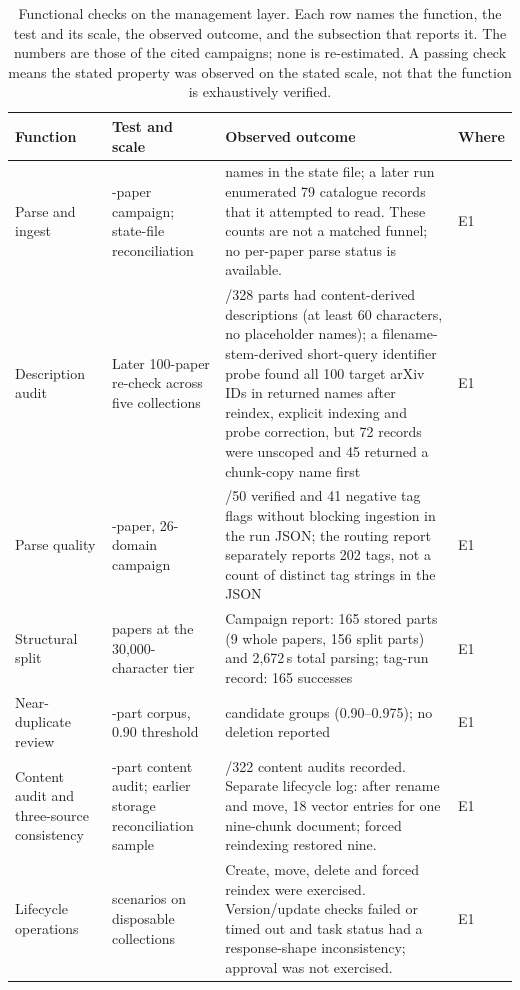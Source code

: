 \documentclass[final,5p,times,twocolumn]{elsarticle}
\begin{document}
\begin{table}[t]
\centering
\footnotesize
\setlength{\tabcolsep}{4pt}
\caption{Functional checks on the management layer. Each row names the
function, the test and its scale, the observed outcome, and the subsection
that reports it. The numbers are those of the cited campaigns; none is
re-estimated. A passing check means the stated property was observed on the
stated scale, not that the function is exhaustively verified.}
\label{tab:kb-checks}
\begin{tabular}{@{}>{\raggedright\arraybackslash}p{}>{\raggedright\arraybackslash}p{}>{\raggedright\arraybackslash}p{}>{\raggedright\arraybackslash}p{}@{}}
\toprule
Function & Test and scale & Observed outcome & Where\\
\midrule
Parse and ingest & 100-paper campaign; state-file reconciliation & 91 names in the state file; a later run enumerated 79 catalogue records that it attempted to read. These counts are not a matched funnel; no per-paper parse status is available. & E1\\
Description audit & Later 100-paper re-check across five collections & 328/328 parts had content-derived descriptions (at least 60 characters, no placeholder names); a filename-stem-derived short-query identifier probe found all 100 target arXiv IDs in returned names after reindex, explicit indexing and probe correction, but 72 records were unscoped and 45 returned a chunk-copy name first & E1\\
Parse quality & 50-paper, 26-domain campaign & 50/50 verified and 41 negative tag flags without blocking ingestion in the run JSON; the routing report separately reports 202 tags, not a count of distinct tag strings in the JSON & E1\\
Structural split & 50 papers at the 30{,}000-character tier & Campaign report: 165 stored parts (9 whole papers, 156 split parts) and 2{,}672\,s total parsing; tag-run record: 165 successes & E1\\
Near-duplicate review & 322-part corpus, 0.90 threshold & 35 candidate groups (0.90--0.975); no deletion reported & E1\\
Content audit and three-source consistency & 322-part content audit; earlier storage reconciliation sample & 322/322 content audits recorded. Separate lifecycle log: after rename and move, 18 vector entries for one nine-chunk document; forced reindexing restored nine. & E1\\
Lifecycle operations & 16 scenarios on disposable collections & Create, move, delete and forced reindex were exercised. Version/update checks failed or timed out and task status had a response-shape inconsistency; approval was not exercised. & E1\\

\end{tabular}
\end{table}
\end{document}
